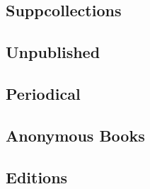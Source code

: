 \documentclass[12pt]{article}
\begin{document}
\autocite{marsalis93aa}

\autocite{doody96aa}

\autocite{brodsky97aa}

\autocite{sears01aa}

\autocite{coetzee01aa}


\subsection{Suppcollections}


\autocite{borges73aa}

\autocite{hamill94aa}

\autocite{atwan00aa}


\subsection{Unpublished}


\autocite{smithXXaa}

\autocite{twainXXaa}

\autocite{octovianXXaa}

\autocite{salviatiXXaa}

\autocite{chaucerXXaa}


\subsection{Periodical}


\autocite{appiah92aa}


\subsection{Anonymous Books}


\autocite{bible84aa}

\autocite{virginia93aa}

\autocite{NewYorkPublicLibrary97aa}


\subsection{Editions}


\autocite{crane75ab}
\end{document}
